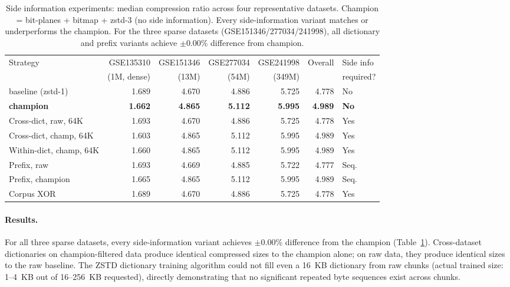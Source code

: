 \documentclass[10pt,twocolumn,letterpaper]{article}
\begin{document}
\begin{table}[h]
\centering
\caption{Side information experiments: median compression ratio across four representative datasets. Champion = bit-planes + bitmap + zstd-3 (no side information). Every side-information variant matches or underperforms the champion. For the three sparse datasets (GSE151346/277034/241998), all dictionary and prefix variants achieve $\pm$0.00\% difference from champion.}
\label{tab:side_info}
\footnotesize
\begin{tabular}{l r r r r r l}
\toprule
Strategy & GSE135310 & GSE151346 & GSE277034 & GSE241998 & Overall & Side info \\
 & (1M, dense) & (13M) & (54M) & (349M) & & required? \\
\midrule
baseline (zstd-1)       & 1.689 & 4.670 & 4.886 & 5.725 & 4.778 & No \\
\textbf{champion}       & \textbf{1.662} & \textbf{4.865} & \textbf{5.112} & \textbf{5.995} & \textbf{4.989} & \textbf{No} \\
\midrule
Cross-dict, raw, 64K    & 1.693 & 4.670 & 4.886 & 5.725 & 4.778 & Yes \\
Cross-dict, champ, 64K  & 1.603 & 4.865 & 5.112 & 5.995 & 4.989 & Yes \\
Within-dict, champ, 64K & 1.660 & 4.865 & 5.112 & 5.995 & 4.989 & Yes \\
Prefix, raw             & 1.693 & 4.669 & 4.885 & 5.722 & 4.777 & Seq. \\
Prefix, champion        & 1.665 & 4.865 & 5.112 & 5.995 & 4.989 & Seq. \\
Corpus XOR              & 1.689 & 4.670 & 4.886 & 5.725 & 4.778 & Yes \\
\bottomrule
\end{tabular}
\end{table}

\paragraph{Results.}
For all three sparse datasets, every side-information variant achieves $\pm$0.00\% difference from the champion (Table~\ref{tab:side_info}).
Cross-dataset dictionaries on champion-filtered data produce identical compressed sizes to the champion alone; on raw data, they produce identical sizes to the raw baseline.
The ZSTD dictionary training algorithm could not fill even a 16~KB dictionary from raw chunks (actual trained size: 1--4~KB out of 16--256~KB requested), directly demonstrating that no significant repeated byte sequences exist across chunks.
\end{document}
